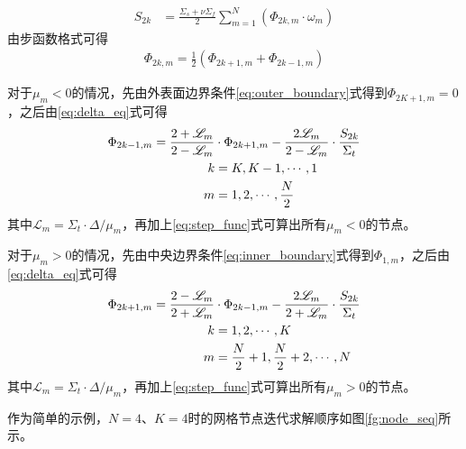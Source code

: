 \documentclass[a4paper,10.5pt]{article}
\newcommand\ml {\mathscr{L}}
\begin{document}
\begin{align}
S_{2k}&=\frac{\Sigma_{s}+\nu\Sigma_{f}}{2}\sum_{m=1}^{N}\left(\Phi_{2k,m}\cdot\omega_{m}\right)
\end{align}
由步函数格式可得
\begin{align}
\Phi_{2k,m}=\frac{1}{2}\left(\Phi_{2k+1,m}+\Phi_{2k-1,m}\right)\label{eq:step_func}
\end{align}
\par
对于$\mu_{m}<0$的情况，先由外表面边界条件\eqref{eq:outer_boundary}式得到$\Phi_{2K+1,m}=0$，之后由\eqref{eq:delta_eq}式可得
\begin{align}
\Phi_{2k-1,m}=\frac{2+\ml_{m}}{2-\ml_{m}}&\cdot\Phi_{2k+1,m}-\frac{2\ml_{m}}{2-\ml_{m}}\cdot\frac{S_{2k}}{\Sigma_{t}}\label{eq:mu<0-iter}\\
k&=K,K-1,\cdots,1\notag\\
m&=1,2,\cdots,\frac{N}{2}\notag
\end{align}
其中$\ml_{m}=\Sigma_{t}\cdot\Delta/\mu_{m}$，再加上\eqref{eq:step_func}式可算出所有$\mu_{m}<0$的节点。
\par
对于$\mu_{m}>0$的情况，先由中央边界条件\eqref{eq:inner_boundary}式得到$\Phi_{1,m}$，之后由\eqref{eq:delta_eq}式可得
\begin{align}
\Phi_{2k+1,m}=\frac{2-\ml_{m}}{2+\ml_{m}}&\cdot\Phi_{2k-1,m}-\frac{2\ml_{m}}{2+\ml_{m}}\cdot\frac{S_{2k}}{\Sigma_{t}}\label{eq:mu>0-iter}\\
k&=1,2,\cdots,K\notag\\
m&=\frac{N}{2}+1,\frac{N}{2}+2,\cdots,N\notag
\end{align}
其中$\ml_{m}=\Sigma_{t}\cdot\Delta/\mu_{m}$，再加上\eqref{eq:step_func}式可算出所有$\mu_{m}>0$的节点。\par
\vspace{0.5cm}
作为简单的示例，$N=4$、$K=4$时的网格节点迭代求解顺序如图\ref{fg:node_seq}所示。
\end{document}
